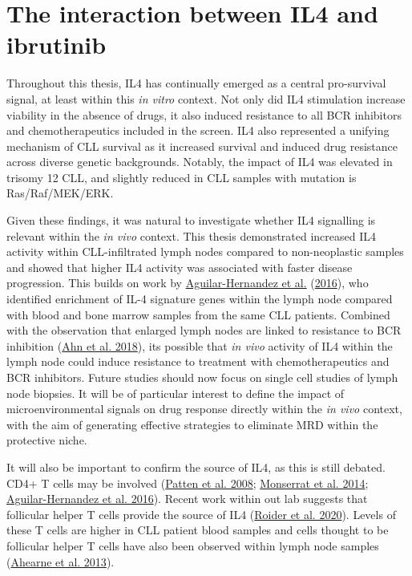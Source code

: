 \documentclass[11pt, a4paper, twosided]{book}
\begin{document}
\hypertarget{discussion-IL4-ibrutinib}{%
\section{The interaction between IL4 and ibrutinib}\label{discussion-IL4-ibrutinib}}

Throughout this thesis, IL4 has continually emerged as a central pro-survival signal, at least within this \emph{in vitro} context. Not only did IL4 stimulation increase viability in the absence of drugs, it also induced resistance to all BCR inhibitors and chemotherapeutics included in the screen. IL4 also represented a unifying mechanism of CLL survival as it increased survival and induced drug resistance across diverse genetic backgrounds. Notably, the impact of IL4 was elevated in trisomy 12 CLL, and slightly reduced in CLL samples with mutation is Ras/Raf/MEK/ERK.

Given these findings, it was natural to investigate whether IL4 signalling is relevant within the \emph{in vivo} context. This thesis demonstrated increased IL4 activity within CLL-infiltrated lymph nodes compared to non-neoplastic samples and showed that higher IL4 activity was associated with faster disease progression. This builds on work by \protect\hyperlink{ref-AguilarHernandez2016}{Aguilar-Hernandez et al.} (\protect\hyperlink{ref-AguilarHernandez2016}{2016}), who identified enrichment of IL-4 signature genes within the lymph node compared with blood and bone marrow samples from the same CLL patients. Combined with the observation that enlarged lymph nodes are linked to resistance to BCR inhibition (\protect\hyperlink{ref-Ahn2018}{Ahn et al. 2018}), its possible that \emph{in vivo} activity of IL4 within the lymph node could induce resistance to treatment with chemotherapeutics and BCR inhibitors. Future studies should now focus on single cell studies of lymph node biopsies. It will be of particular interest to define the impact of microenvironmental signals on drug response directly within the \emph{in vivo} context, with the aim of generating effective strategies to eliminate MRD within the protective niche.

It will also be important to confirm the source of IL4, as this is still debated. CD4+ T cells may be involved (\protect\hyperlink{ref-Patten2008}{Patten et al. 2008}; \protect\hyperlink{ref-Monserrat2014}{Monserrat et al. 2014}; \protect\hyperlink{ref-AguilarHernandez2016}{Aguilar-Hernandez et al. 2016}). Recent work within out lab suggests that follicular helper T cells provide the source of IL4 (\protect\hyperlink{ref-Roider2020}{Roider et al. 2020}). Levels of these T cells are higher in CLL patient blood samples and cells thought to be follicular helper T cells have also been observed within lymph node samples (\protect\hyperlink{ref-Ahearne2013}{Ahearne et al. 2013}).
\end{document}
